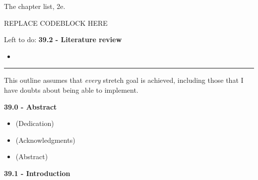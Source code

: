 The chapter list, 2e.

REPLACE CODEBLOCK HERE

Left to do: \textbf{39.2 - Literature review}

\begin{itemize}
\tightlist
\item
\end{itemize}

\begin{center}\rule{0.5\linewidth}{0.5pt}\end{center}

This outline assumes that \emph{every} stretch goal is achieved,
including those that I have doubts about being able to implement.

\textbf{39.0 - Abstract}

\begin{itemize}
\tightlist
\item
  (Dedication)
\item
  (Acknowledgments)
\item
  (Abstract)
\end{itemize}

\textbf{39.1 - Introduction}

